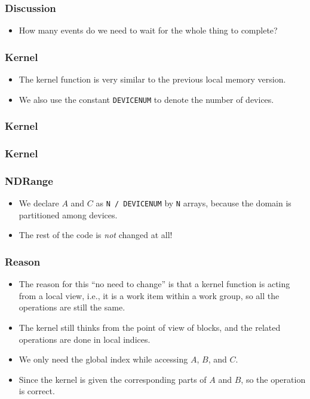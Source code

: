 \documentclass{beamer}
\begin{document}
\begin{frame}
  \frametitle{Discussion}
  \begin{itemize}
    \item How many events do we need to wait for the whole thing to
      complete?
  \end{itemize}
\end{frame}

\begin{frame}
  \frametitle{Kernel}
  \begin{itemize}
    \item The kernel function is very similar to the previous local
      memory version.
    \item We also use the constant {\tt DEVICENUM} to denote the
      number of devices.
  \end{itemize}
\end{frame}
  
\begin{frame}
  \frametitle{Kernel}
\end{frame}

\begin{frame}
  \frametitle{Kernel}
\end{frame}

\begin{frame}
  \frametitle{NDRange}
  \begin{itemize}
    \item We declare $A$ and $C$ as {\tt N / DEVICENUM} by {\tt N}
      arrays, because the domain is partitioned among devices.
    \item The rest of the code is {\em not} changed at all!
  \end{itemize}
\end{frame}

\begin{frame}
  \frametitle{Reason}
  \begin{itemize}
  \item The reason for this ``no need to change'' is that a kernel
    function is acting from a local view, i.e., it is a work item
    within a work group, so all the operations are still the same.
  \item The kernel still thinks from the point of view of blocks, and
    the related operations are done in local indices.
  \item We only need the global index while accessing $A$, $B$, and
    $C$.
  \item Since the kernel is given the corresponding parts of $A$ and
    $B$, so the operation is correct.
  \end{itemize}
\end{frame}
\end{document}
